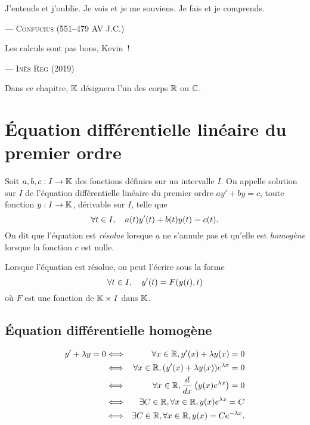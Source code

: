 \documentclass{magnolia}
\begin{document}
\setlength{}
\epigraph{\og J'entends et j'oublie. Je vois et je me souviens. Je fais et je comprends.\fg}{--- \textsc{Confucius (551--479 AV J.C.)}}
\setlength{}
\epigraph{\og Les calculs sont pas bons, Kevin~!\fg}{--- \textsc{Inès Reg (2019)}}

\magtoc

\vspace{2ex}
Dans ce chapitre, $\mathbb{K}$ désignera l'un des corps $\mathbb{R}$ ou $\mathbb{C}$.

\section{Équation différentielle linéaire du premier ordre}

\begin{definition}
Soit $a,b,c:I\to\mathbb{K}$ des fonctions définies sur un intervalle $I$. On appelle
solution sur $I$ de l'équation différentielle linéaire du premier ordre $a y'+b y=c$, toute
fonction $y:I\to\mathbb{K}$, dérivable sur $I$, telle que
\[\forall t\in I,\quad a(t)y'(t)+b(t)y(t)=c(t).\]
On dit que l'équation est \emph{résolue} lorsque $a$ ne s'annule pas et qu'elle est
\emph{homogène} lorsque la fonction $c$ est nulle.
\end{definition}

\begin{remarqueUnique}
\remarque Lorsque l'équation est résolue, on peut l'écrire sous la forme
  \[\forall t\in I,\quad y'(t)=F(y(t),t)\]
  où $F$ est une fonction de $\mathbb{K}\times I$ dans $\mathbb{K}$.
\end{remarqueUnique}

\subsection{Équation différentielle homogène}


\begin{sol}
\begin{victor}
\begin{eqnarray*}
y'+\lambda y=0 &\Longleftrightarrow& \forall x \in \mathbb{R}, y'(x)+\lambda y(x)=0 \\
&\Longleftrightarrow& \forall x \in \mathbb{R}, (y'(x)+\lambda y(x))e^{\lambda x}=0 \\
&\Longleftrightarrow& \forall x \in \mathbb{R}, \frac{d}{dx}\left(y(x)e^{\lambda x}\right)=0 \\
&\Longleftrightarrow& \exists C\in \mathbb{R}, \forall x \in \mathbb{R}, y(x)e^{\lambda x}=C \\
&\Longleftrightarrow& \exists C\in \mathbb{R}, \forall x \in \mathbb{R}, y(x)=Ce^{-\lambda x}.
\end{eqnarray*}
\end{victor}
\end{sol}
\end{document}
